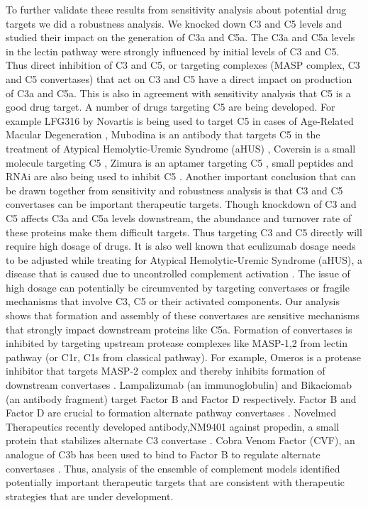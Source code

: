 \documentclass[12pt]{article}
\begin{document}
To further validate these results from sensitivity analysis about potential drug targets we did a robustness analysis. We knocked down C3 and C5 levels and studied their impact on the generation of C3a and C5a. The C3a and C5a levels in the lectin pathway were strongly influenced by initial levels of C3 and C5. Thus direct inhibition of C3 and C5, or targeting complexes (MASP complex, C3 and C5 convertases) that act on C3 and C5 have a direct impact on production of C3a and C5a. This is also in agreement with sensitivity analysis that C5 is a good drug target. A number of drugs targeting C5 are being developed. For example LFG316 by Novartis is being used to target C5 in cases of Age-Related Macular Degeneration \cite{roguska2014generation}, Mubodina is an antibody that targets C5 in the treatment of Atypical Hemolytic-Uremic Syndrome (aHUS) \cite{melis2015complement}, Coversin is a small molecule targeting C5 \cite{weston2014clinical}, Zimura is an aptamer targeting C5 \cite{epstein2007complement}, small peptides and RNAi are also being used to inhibit C5 \cite{borodovsky2014aln}. Another important conclusion that can be drawn together from sensitivity and robustness analysis is that C3 and C5 convertases can be important therapeutic targets. Though knockdown of C3 and C5 affects C3a and C5a levels downstream, the abundance and turnover rate \cite{sissons1977metabolism, swaak1982determination} of these proteins make them difficult targets. Thus targeting C3 and C5 directly will require high dosage of drugs. It is also well known that eculizumab dosage needs to be adjusted while treating for Atypical Hemolytic-Uremic Syndrome (aHUS), a disease that is caused due to uncontrolled complement activation \cite{noris2014dynamics}. The issue of high dosage can potentially be circumvented by targeting convertases or fragile mechanisms that involve C3, C5 or their activated components. Our analysis shows that formation and assembly of these convertases are sensitive mechanisms that strongly impact downstream proteins like C5a. Formation of convertases is inhibited by targeting upstream protease complexes like MASP-1,2 from lectin pathway (or C1r, C1s from classical pathway). For example, Omeros is a protease inhibitor that targets MASP-2 complex and thereby inhibits formation of downstream convertases \cite{schwaeble2011methods}. Lampalizumab (an immunoglobulin) and Bikaciomab (an antibody fragment) target Factor B and Factor D respectively. Factor B and Factor D are crucial to formation alternate pathway convertases \cite{katschke2012inhibiting, hu2013therapeutic}. Novelmed Therapeutics recently developed antibody,NM9401 against propedin, a small protein that stabilizes alternate C3 convertase \cite{bansal2014humanized}. Cobra Venom Factor (CVF), an analogue of C3b has been used to bind to Factor B to regulate alternate convertases \cite{vogel2004recombinant}.  Thus, analysis of the ensemble of complement models identified potentially important therapeutic targets that are consistent with therapeutic strategies that are under development.
\end{document}
